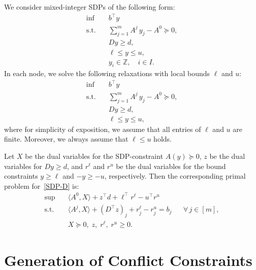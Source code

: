 \documentclass[10pt, a4paper]{article}
\newcommand{\skal}[2]{\langle{#1},{#2}\rangle}
\newcommand{\T}{^{\top}}
\newcommand{\Z}{\mathds{Z}}
\begin{document}
We consider mixed-integer SDPs of the following form:
\begin{equation}\label{MISDP}
  \begin{aligned}
    \inf \quad & b\T y \\
    \text{s.t.} \quad & \sum_{j=1}^m A^j\, y_j - A^0 \succeq 0, \\
    & D y \geq d,\\
    & \ell \leq y \leq u,\\
    & y_i \in \Z,\quad i \in I.
  \end{aligned}
\end{equation}
In each node, we solve the following relaxations with local bounds $\ell$
and $u$:
\begin{equation}\label{SDP-D}
  \begin{aligned}
    \inf \quad & b\T y \\
    \text{s.t.} \quad & \sum_{j=1}^m A^j\, y_j - A^0 \succeq 0, \\
    & D y \geq d,\\
    & \ell \leq y \leq u,
  \end{aligned}
\end{equation}
where for simplicity of exposition, we assume that all entries of $\ell$
and $u$ are finite. Moreover, we always assume that $\ell \leq u$ holds.

Let $X$ be the dual variables for the SDP-constraint $A(y) \succeq 0$, $z$
be the dual variables for $Dy \geq d$, and $r^\ell$ and $r^u$ be the dual
variables for the bound constraints $y \geq \ell$ and $-y \geq -u$,
respectively. Then the corresponding primal problem for~\eqref{SDP-D} is:
\begin{equation}\label{SDP-P}
  \begin{aligned}
     \sup \quad & \skal{A^0}{X} + z\T d + \ell\T r^\ell - u\T r^u\\
     \text{s.t.} \quad & \skal{A^j}{X} + (D\T z)_j + r^\ell_j - r^u_j = b_j && \forall \, j \in [m],\\
     & X \succeq 0,\; z, \; r^\ell,\; r^u \geq 0.
  \end{aligned}
\end{equation}


\section{Generation of Conflict Constraints}
\end{document}
